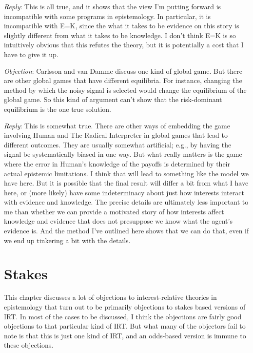 \documentclass[11pt,]{book}
\begin{document}
\emph{Reply}: This is all true, and it shows that the view I'm putting forward is incompatible with some programs in epistemology. In particular, it is incompatible with E=K, since the what it takes to be evidence on this story is slightly different from what it takes to be knowledge. I don't think E=K is so intuitively obvious that this refutes the theory, but it is potentially a cost that I have to give it up.

\emph{Objection}: Carlsson and van Damme discuss one kind of global game. But there are other global games that have different equilibria. For instance, changing the method by which the noisy signal is selected would change the equilibrium of the global game. So this kind of argument can't show that the risk-dominant equilibrium is the one true solution.

\emph{Reply}: This is somewhat true. There are other ways of embedding the game involving Human and The Radical Interpreter in global games that lead to different outcomes. They are usually somewhat artificial; e.g., by having the signal be systematically biased in one way. But what really matters is the game where the error in Human's knowledge of the payoffs is determined by their actual epistemic limitations. I think that will lead to something like the model we have here. But it is possible that the final result will differ a bit from what I have here, or (more likely) have some indeterminacy about just how interests interact with evidence and knowledge. The precise details are ultimately less important to me than whether we can provide a motivated story of how interests affect knowledge and evidence that does not presuppose we know what the agent's evidence is. And the method I've outlined here shows that we can do that, even if we end up tinkering a bit with the details.

\hypertarget{stakes}{%
\chapter{Stakes}\label{stakes}}

This chapter discusses a lot of objections to interest-relative theories in epistemology that turn out to be primarily objections to stakes based versions of IRT. In most of the cases to be discussed, I think the objections are fairly good objections to that particular kind of IRT. But what many of the objectors fail to note is that this is just one kind of IRT, and an odds-based version is immune to these objections.
\end{document}
